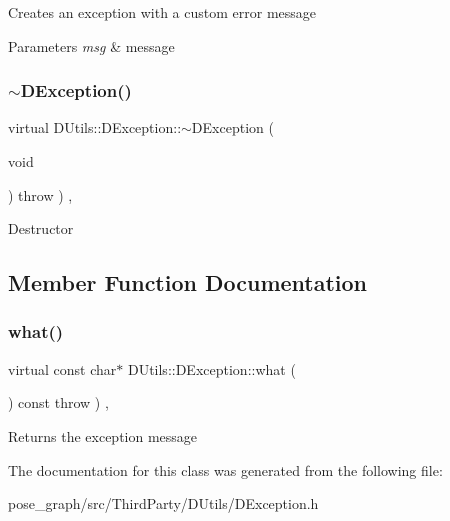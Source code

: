 Creates an exception with a custom error message 
\begin{DoxyParams}{Parameters}
{\em msg} & message \\
\hline
\end{DoxyParams}
\mbox{\label{classDUtils_1_1DException_a12deb785f50e9cb2db3541ffb60a20bb}} 
\subsubsection{\texorpdfstring{$\sim$\+D\+Exception()}{~DException()}}
{\footnotesize\ttfamily virtual D\+Utils\+::\+D\+Exception\+::$\sim$\+D\+Exception (\begin{DoxyParamCaption}\item[{void}]{ }\end{DoxyParamCaption}) throw  ) \hspace{0.3cm}{\ttfamily [inline]}, {\ttfamily [virtual]}}

Destructor 

\subsection{Member Function Documentation}
\mbox{\label{classDUtils_1_1DException_ad5d0ccb4bf61cdb3e23b2b5b9e1a402c}} 
\subsubsection{\texorpdfstring{what()}{what()}}
{\footnotesize\ttfamily virtual const char$\ast$ D\+Utils\+::\+D\+Exception\+::what (\begin{DoxyParamCaption}{ }\end{DoxyParamCaption}) const throw  ) \hspace{0.3cm}{\ttfamily [inline]}, {\ttfamily [virtual]}}

Returns the exception message 

The documentation for this class was generated from the following file\+:\begin{DoxyCompactItemize}
\item 
pose\+\_\+graph/src/\+Third\+Party/\+D\+Utils/D\+Exception.\+h\end{DoxyCompactItemize}
